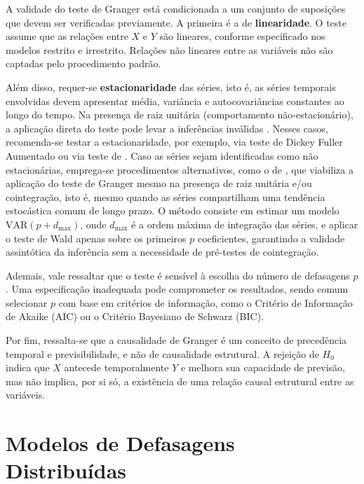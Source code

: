 A validade do teste de Granger está condicionada a um conjunto de suposições que devem ser verificadas previamente. A primeira é a de \textbf{linearidade}. O teste assume que as relações entre $X$ e $Y$ são lineares, conforme especificado nos modelos restrito e irrestrito. Relações não lineares entre as variáveis não são captadas pelo procedimento padrão.

Além disso, requer-se \textbf{estacionaridade} das séries, isto é, as séries temporais envolvidas devem apresentar média, variância e autocovariâncias constantes ao longo do tempo. Na presença de raiz unitária (comportamento não-estacionário), a aplicação direta do teste pode levar a inferências inválidas \citep{phillips1988}. Nesses casos, recomenda-se testar a estacionaridade,  por exemplo, via teste de Dickey Fuller Aumentado \citep{dickey1979} ou via teste de \cite{phillips1988}. Caso as séries sejam identificadas como não estacionárias, emprega-se procedimentos alternativos, como o de \citet{toda1995}, que viabiliza a aplicação do teste de Granger mesmo na presença de raiz unitária e/ou cointegração, isto é, mesmo quando as séries compartilham uma tendência estocástica comum de longo prazo. O método consiste em estimar um modelo $\mathrm{VAR}(p + d_{\max})$, onde $d_{\max}$ é a ordem máxima de integração das séries, e aplicar o teste de Wald apenas sobre os primeiros $p$ coeficientes, garantindo a validade assintótica da inferência sem a necessidade de pré-testes de cointegração.


Ademais, vale ressaltar que o teste é sensível à escolha do número de defasagens $p$. Uma especificação inadequada pode comprometer os resultados, sendo comum selecionar $p$ com base em critérios de informação, como o Critério de Informação de Akaike (AIC) ou o Critério Bayesiano de Schwarz (BIC).


Por fim, ressalta-se que a causalidade de Granger é um conceito de precedência temporal e previsibilidade, e não de causalidade estrutural. A rejeição de $H_0$ indica que $X$ antecede temporalmente $Y$ e melhora sua capacidade de previsão, mas não implica, por si só, a existência de uma relação causal estrutural entre as variáveis.



\section{Modelos de Defasagens Distribuídas}

